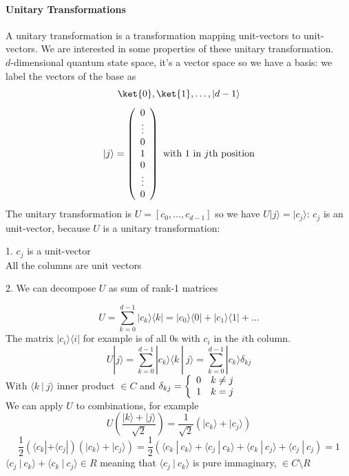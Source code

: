 \documentclass[10pt]{report}
\begin{document}
\paragraph{Unitary Transformations} A unitary transformation is a transformation mapping unit-vectors to unit-vectors. We are interested in some properties of these unitary transformation.\\
$d$-dimensional quantum state space, it's a vector space so we have a basis: we label the vectors of the base as $$\ket{0}, \ket{1},\ldots,|d-1\rangle$$
$$|j\rangle = \left(\begin{array}{c}
0\\\vdots\\0\\1\\0\\\vdots\\0
\end{array}\right)\hbox{ with }1\hbox{ in }j\hbox{th position}$$
The unitary transformation is $U = [c_0,\ldots,c_{d-1}]$ so we have $U|j\rangle = |c_j\rangle$: $c_j$ is an unit-vector, because $U$ is a unitary transformation:
\begin{list}{}{}
	\item[1.] $c_j$ is a unit-vector\\All the columns are unit vectors
	\item[2.] We can decompose $U$ as sum of rank-1 matrices
\end{list}
$$U=\sum_{k=0}^{d-1}|c_k\rangle\langle k| = |c_0\rangle\langle 0| + |c_1\rangle\langle 1| + \ldots$$
The matrix $|c_i\rangle\langle i|$ for example is of all 0s with $c_i$ in the $i$th column. $$U|j\rangle = \sum_{k=0}^{d-1}|c_k\rangle\langle k\:|\:j\rangle = \sum_{k=0}^{d-1} |c_k\rangle\delta_{kj}$$
With $\langle k\:|\:j\rangle$ inner product $\in C$ and $\delta_{kj} = \left\{\begin{array}{l l}
0&k\neq j\\
1&k = j
\end{array}\right.$\\
We can apply $U$ to combinations, for example $$U\left(\frac{|k\rangle + |j\rangle}{\sqrt{2}}\right) = \frac{1}{\sqrt{2}}(|c_k\rangle + |c_j\rangle)$$
$$\frac{1}{2}(\langle c_k|+\langle c_j|)(|c_k\rangle + |c_j\rangle) = \frac{1}{2}\left(\langle c_k\:|\:c_k\rangle + \langle c_j\:|\:c_k\rangle + \langle c_k\:|\:c_j\rangle + \langle c_j\:|\:c_j\right)=1$$
$\langle c_j\:|\:c_k\rangle + \langle c_k\:|\:c_j\rangle \in R$ meaning that $\langle c_j\:|\:c_k\rangle$ is pure immaginary, $\in C\setminus R$\\\\
\end{document}
